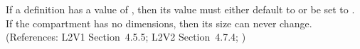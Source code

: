If a \Compartment definition has a  value of
, then its   value must either default to or be
set to .  If the compartment has no dimensions, then its size can
never change.  (References: L2V1 Section~4.5.5; L2V2 Section~4.7.4; )
